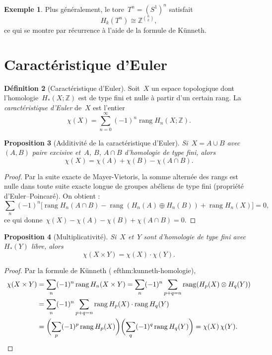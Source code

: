 \documentclass[12pt,a4paper,openany]{book}
\theoremstyle{definition}
\newtheorem{definition}{Définition}[chapter]
\newtheorem{exemple}[definition]{Exemple}
\theoremstyle{plain}
\newtheorem{proposition}[definition]{Proposition}
\theoremstyle{remark}
\newcommand{\Z}{\mathbb{Z}}
\begin{document}
\begin{exemple}\label{ex:kunneth-tore-n}
Plus généralement, le tore~$T^n = (S^1)^n$ satisfait
\[
  H_k(T^n) \cong \Z^{\binom{n}{k}},
\]
ce qui se montre par récurrence à l'aide de la formule de Künneth.
\end{exemple}

\section{Caractéristique d'Euler}\label{sec:euler}

\begin{definition}[Caractéristique d'Euler]\label{def:euler}
Soit~$X$ un espace topologique dont l'homologie~$H_*(X;\Z)$ est de type fini et
nulle à partir d'un certain rang. La \emph{caractéristique d'Euler} de~$X$ est
l'entier
\[
  \chi(X) = \sum_{n=0}^{\infty} (-1)^n \operatorname{rang} H_n(X;\Z).
\]
\end{definition}

\begin{proposition}[Additivité de la caractéristique d'Euler]\label{prop:euler-additivite}
Si~$X = A \cup B$ avec~$(A, B)$ paire excisive et~$A$, $B$, $A \cap B$ d'homologie
de type fini, alors
\[
  \chi(X) = \chi(A) + \chi(B) - \chi(A \cap B).
\]
\end{proposition}

\begin{proof}
Par la suite exacte de Mayer-Vietoris, la somme alternée des rangs est nulle dans
toute suite exacte longue de groupes abéliens de type fini (propriété d'Euler--Poincaré).
On obtient :
\[
  \sum_{n}(-1)^n\bigl[\operatorname{rang} H_n(A \cap B) - \operatorname{rang}(H_n(A)
  \oplus H_n(B)) + \operatorname{rang} H_n(X)\bigr] = 0,
\]
ce qui donne~$\chi(X) - \chi(A) - \chi(B) + \chi(A \cap B) = 0$.
\end{proof}

\begin{proposition}[Multiplicativité]\label{prop:euler-multiplicativite}
Si~$X$ et~$Y$ sont d'homologie de type fini avec~$H_*(Y)$ libre, alors
\[
  \chi(X \times Y) = \chi(X) \cdot \chi(Y).
\]
\end{proposition}

\begin{proof}
Par la formule de Künneth (
ef{thm:kunneth-homologie}),
\begin{align*}
  \chi(X \times Y) &= \sum_n (-1)^n \operatorname{rang} H_n(X \times Y)
  = \sum_n (-1)^n \sum_{p+q=n} \operatorname{rang}(H_p(X) \otimes H_q(Y))\\
  &= \sum_n (-1)^n \sum_{p+q=n} \operatorname{rang} H_p(X) \cdot \operatorname{rang} H_q(Y)\\
  &= \biggl(\sum_p (-1)^p \operatorname{rang} H_p(X)\biggr)
    \biggl(\sum_q (-1)^q \operatorname{rang} H_q(Y)\biggr) = \chi(X)\,\chi(Y).
    \qedhere
\end{align*}
\end{proof}
\end{document}
